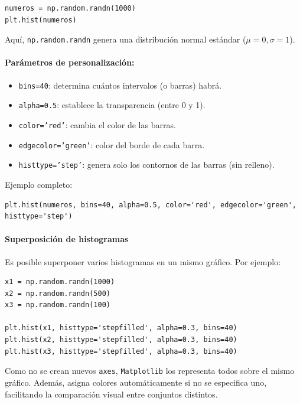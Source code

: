 \documentclass{article}
\theoremstyle{nonumberplain}
\begin{document}
\begin{verbatim}
numeros = np.random.randn(1000)
plt.hist(numeros)
\end{verbatim}

Aquí, \texttt{np.random.randn} genera una distribución normal estándar (\(\mu = 0, \sigma = 1\)). 

\paragraph{Parámetros de personalización:}

\begin{itemize}
  \item \texttt{bins=40}: determina cuántos intervalos (o barras) habrá.
  \item \texttt{alpha=0.5}: establece la transparencia (entre 0 y 1).
  \item \texttt{color='red'}: cambia el color de las barras.
  \item \texttt{edgecolor='green'}: color del borde de cada barra.
  \item \texttt{histtype='step'}: genera solo los contornos de las barras (sin relleno).
\end{itemize}

Ejemplo completo:

\begin{verbatim}
plt.hist(numeros, bins=40, alpha=0.5, color='red', edgecolor='green', histtype='step')
\end{verbatim}

\paragraph{Superposición de histogramas}

Es posible superponer varios histogramas en un mismo gráfico. Por ejemplo:

\begin{verbatim}
x1 = np.random.randn(1000)
x2 = np.random.randn(500)
x3 = np.random.randn(100)

plt.hist(x1, histtype='stepfilled', alpha=0.3, bins=40)
plt.hist(x2, histtype='stepfilled', alpha=0.3, bins=40)
plt.hist(x3, histtype='stepfilled', alpha=0.3, bins=40)
\end{verbatim}

Como no se crean nuevos \texttt{axes}, \texttt{Matplotlib} los representa todos sobre el mismo gráfico. Además, asigna colores automáticamente si no se especifica uno, facilitando la comparación visual entre conjuntos distintos.
\end{document}

